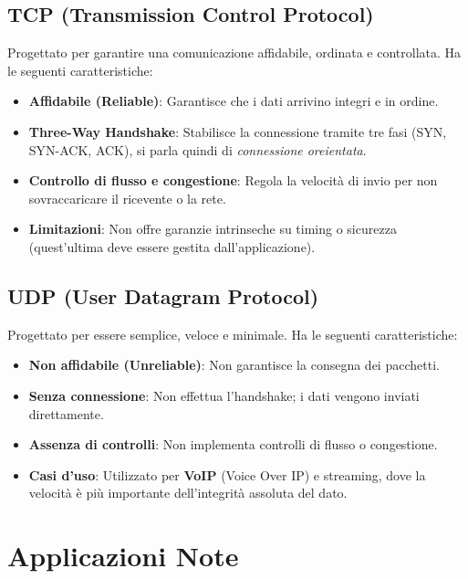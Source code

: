 \documentclass[12pt,a4paper,oneside]{book}
\begin{document}
\subsection{TCP (Transmission Control Protocol)}
Progettato per garantire una comunicazione affidabile, ordinata e controllata. Ha le seguenti caratteristiche:
\begin{itemize}
    \item \textbf{Affidabile (Reliable)}: Garantisce che i dati arrivino integri e in ordine.
    \item \textbf{Three-Way Handshake}: Stabilisce la connessione tramite tre fasi (SYN, SYN-ACK, ACK), si parla quindi di \textit{connessione oreientata}.
    \item \textbf{Controllo di flusso e congestione}: Regola la velocità di invio per non sovraccaricare il ricevente o la rete.
    \item \textbf{Limitazioni}: Non offre garanzie intrinseche su timing o sicurezza (quest'ultima deve essere gestita dall'applicazione).
\end{itemize}

\subsection{UDP (User Datagram Protocol)}
Progettato per essere semplice, veloce e minimale. Ha le seguenti caratteristiche:
\begin{itemize}
    \item \textbf{Non affidabile (Unreliable)}: Non garantisce la consegna dei pacchetti.
    \item \textbf{Senza connessione}: Non effettua l'handshake; i dati vengono inviati direttamente.
    \item \textbf{Assenza di controlli}: Non implementa controlli di flusso o congestione.
    \item \textbf{Casi d'uso}: Utilizzato per \textbf{VoIP} (Voice Over IP) e streaming, dove la velocità è più importante dell'integrità assoluta del dato.
\end{itemize}

\section{Applicazioni Note}
\end{document}
